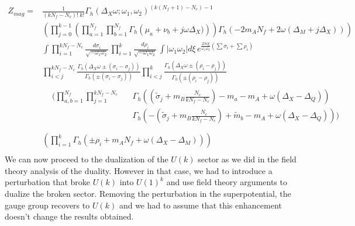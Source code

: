 \begin{equation}
\begin{aligned}
Z_{mag} 
= &
	\frac{1}{ (k N_f - N_c)! \; k! } 
 \Gamma_h ( \Delta_X \omega ; \omega_1 , \omega_2)^{ (k(N_f+1) - N_c) -1}  \\
 &  \left( \prod_{j=0}^{k-1}
\left( \prod_{a=1}^{N_f } \prod_{b=1}^{N_f}  \Gamma_h \left( \mu_a+  \nu_b + j \omega \Delta_X) \right) \right) \Gamma_h \left(- 2 m_A N_f +  2 \omega( \Delta_M + j \Delta_X) \right)  \right) \\
%
&\int  \prod_{i=1}^{ k N_f - N_c } \frac{d \sigma_i }{\sqrt{-\omega_1 \omega_2}}\, 
 \prod_{i=1}^{ k } \frac{d \rho_i}{\sqrt{-\omega_1 \omega_2}}
	\, \int | \omega_1 \omega_2 | d \xi \, e^{\frac{2 \pi i \xi}{\omega_1 \omega_2} ( \sum \sigma_i + \sum \rho_i)}  \\
%
& \prod_{ i<j }^{ k N_f - N_c } \frac{ \Gamma_h( \Delta_X \omega \pm (\sigma_i - \sigma_j)) }{ \Gamma_h ( \pm (\sigma_i - \sigma_j) )} \prod_{i<j }^{k } \frac{ \Gamma_h( \Delta_X \omega \pm (\rho_i - \rho_j)) }{ \Gamma_h ( \pm (\rho_i - \rho_j) )}\\
%
& \begin{aligned}
 &  \biggl(  \prod_{a,b=1}^{N_f} \prod_{j=1}^{k N_f - N_c }  &&\Gamma_h \left( \left(\tilde{\sigma}_j +  m_B \frac{N_c}{k N_f-N_c}\right) - m_a - m_A + \omega (\Delta_X - \Delta_Q)    \right) \\
 & &&\Gamma_h \left( - \left( \tilde{\sigma}_j + m_B \frac{N_c}{k N_f -N_c} \right) + \tilde{m}_b - m_A + \omega (\Delta_X - \Delta_Q)  \right) \biggr)\\
 \end{aligned}\\
 & \left( \prod_{i=1}^{k} \Gamma_h \left( \pm \rho_i  + m_A N_f + \omega( \Delta_X - {\Delta_M }) \right) \right)\\
\end{aligned}
 \label{eqn:mag_part_fun_before_dualization}
\end{equation}
We can now proceed to the dualization of the $U(k)$ sector as we did in the field theory analysis of the duality.
However in that case, we had to introduce a perturbation that broke $U(k)$ into $U(1)^k$ and use field theory arguments to dualize the broken sector.
Removing the perturbation in the superpotential, the gauge group recovers to $U(k)$ and we had to assume that this enhancement doesn't change the results obtained.\\
